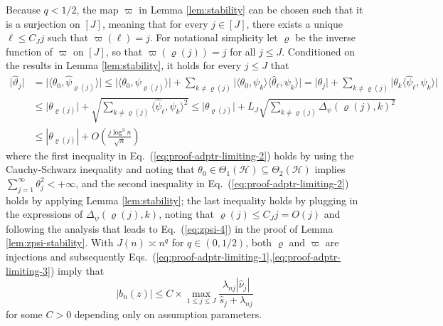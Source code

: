 \documentclass[11pt,a4paper]{article}
\renewcommand{\hat}{\widehat}
\theoremstyle{definition}
\theoremstyle{plain}
\theoremstyle{remark}
\newcommand{\mH}{\mathcal H}
\newcommand{\pd}[1]{
	{ \color{blue} PD: #1}
}
\begin{document}
{\color{magenta}
Because $q<1/2$, the map $\varpi$ in Lemma \ref{lem:stability} can be chosen such that it is a surjection on $[J]$, meaning that for every $j\in[J]$, there exists a unique $\ell\leq C_J j$
such that $\varpi(\ell)=j$. For notational simplicity let $\varrho$ be the inverse function of $\varpi$ on $[J]$, so that $\varpi(\varrho(j))=j$ for all $j\leq J$.
Conditioned on the results in Lemma \ref{lem:stability}, it holds for every $j\leq J$ that
\begin{align}
\big|\hat\vartheta_j\big| &= \big|\langle \theta_0,\hat\psi_{\varrho(j)}\rangle\big| \leq \big|\langle \theta_0,\psi_{\varrho(j)}\rangle\big| + \sum_{k\neq \varrho(j)}\big|\langle\theta_0,\psi_k\rangle\langle\hat\theta_\ell,\psi_k\rangle\big|
=\big|\theta_j\big| + \sum_{k\neq \varrho(j)}\big|\theta_k\langle\hat\psi_\ell,\psi_k\rangle\big|\nonumber\\
&\leq \big|\theta_{\varrho(j)}\big| + \sqrt{\sum_{k\neq \varrho(j)}\langle\hat\psi_\ell,\psi_k\rangle^2} \leq \big|\theta_{\varrho(j)}\big| + L_J\sqrt{\sum_{k\neq {\varrho(j)}}\Delta_\psi(\varrho(j),k)^2}\label{eq:proof-adptr-limiting-2}\\
&\leq |\theta_{\varrho(j)}| + O\left(\frac{j\log^3 n}{\sqrt{n}}\right)\label{eq:proof-adptr-limiting-3}
\end{align}
where the first inequality in Eq.~(\ref{eq:proof-adptr-limiting-2}) holds by using the Cauchy-Schwarz inequality and noting that $\theta_0\in\Theta_1(\mH)\subseteq\Theta_2(\mH)$ implies $\sum_{j=1}^{\infty}\theta_j^2<+\infty$,
and the second inequality in Eq.~(\ref{eq:proof-adptr-limiting-2}) holds by applying Lemma \ref{lem:stability}; the last inequality holds by plugging in the expressions of $\Delta_\psi(\varrho(j),k)$,
noting that $\varrho(j)\leq C_J j=O(j)$
and following the analysis that leads to Eq.~(\ref{eq:zpsi-4}) in the proof of Lemma \ref{lem:zpsi-stability}.
With $J(n)\asymp n^q$ for $q\in(0,1/2)$, both $\varrho$ and $\varpi$ are injections and subsequently Eqs.~(\ref{eq:proof-adptr-limiting-1},\ref{eq:proof-adptr-limiting-3}) imply that
\begin{equation}
\big|b_n(z)\big| \leq C\times  \max_{1\leq j\leq J}\frac{\lambda_{nj}|\hat\nu_j|}{\hat s_j+\lambda_{nj}}
\label{eq:proof-adptr-limiting-4}
\end{equation}
for some $C>0$ depending only on assumption parameters. 
}
\end{document}
